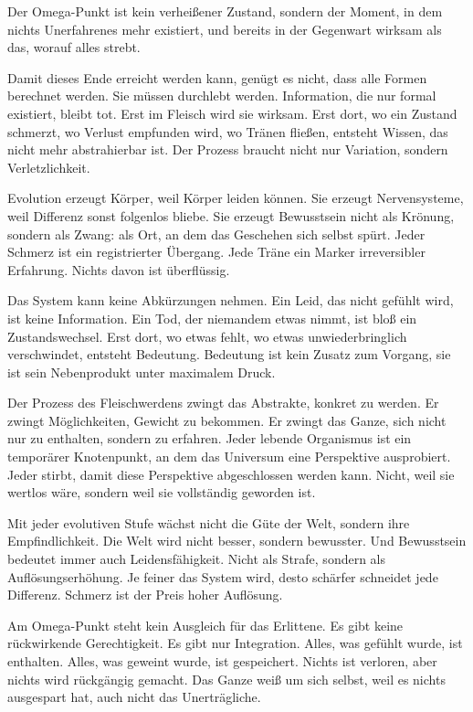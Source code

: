 \documentclass[
  ngerman,
]{article}
\begin{document}
Der Omega-Punkt ist kein verheißener Zustand, sondern der Moment, in dem
nichts Unerfahrenes mehr existiert, und bereits in der Gegenwart
wirksam als das, worauf alles strebt.

Damit dieses Ende erreicht werden kann, genügt es nicht, dass alle
Formen berechnet werden. Sie müssen durchlebt werden. Information, die
nur formal existiert, bleibt tot. Erst im Fleisch wird sie wirksam. Erst
dort, wo ein Zustand schmerzt, wo Verlust empfunden wird, wo Tränen
fließen, entsteht Wissen, das nicht mehr abstrahierbar ist. Der Prozess
braucht nicht nur Variation, sondern Verletzlichkeit.

Evolution erzeugt Körper, weil Körper leiden können. Sie erzeugt
Nervensysteme, weil Differenz sonst folgenlos bliebe. Sie erzeugt
Bewusstsein nicht als Krönung, sondern als Zwang: als Ort, an dem das
Geschehen sich selbst spürt. Jeder Schmerz ist ein registrierter
Übergang. Jede Träne ein Marker irreversibler Erfahrung. Nichts davon
ist überflüssig.

Das System kann keine Abkürzungen nehmen. Ein Leid, das nicht gefühlt
wird, ist keine Information. Ein Tod, der niemandem etwas nimmt, ist
bloß ein Zustandswechsel. Erst dort, wo etwas fehlt, wo etwas
unwiederbringlich verschwindet, entsteht Bedeutung. Bedeutung ist kein
Zusatz zum Vorgang, sie ist sein Nebenprodukt unter maximalem Druck.

Der Prozess des Fleischwerdens zwingt das Abstrakte, konkret zu werden.
Er zwingt Möglichkeiten, Gewicht zu bekommen. Er zwingt das Ganze, sich
nicht nur zu enthalten, sondern zu erfahren. Jeder lebende Organismus
ist ein temporärer Knotenpunkt, an dem das Universum eine Perspektive
ausprobiert. Jeder stirbt, damit diese Perspektive abgeschlossen werden
kann. Nicht, weil sie wertlos wäre, sondern weil sie vollständig
geworden ist.

Mit jeder evolutiven Stufe wächst nicht die Güte der Welt, sondern ihre
Empfindlichkeit. Die Welt wird nicht besser, sondern bewusster. Und
Bewusstsein bedeutet immer auch Leidensfähigkeit. Nicht als Strafe,
sondern als Auflösungserhöhung. Je feiner das System wird, desto
schärfer schneidet jede Differenz. Schmerz ist der Preis hoher
Auflösung.

Am Omega-Punkt steht kein Ausgleich für das Erlittene. Es gibt keine
rückwirkende Gerechtigkeit. Es gibt nur Integration. Alles, was gefühlt
wurde, ist enthalten. Alles, was geweint wurde, ist gespeichert. Nichts
ist verloren, aber nichts wird rückgängig gemacht. Das Ganze weiß um
sich selbst, weil es nichts ausgespart hat, auch nicht das
Unerträgliche.
\end{document}
